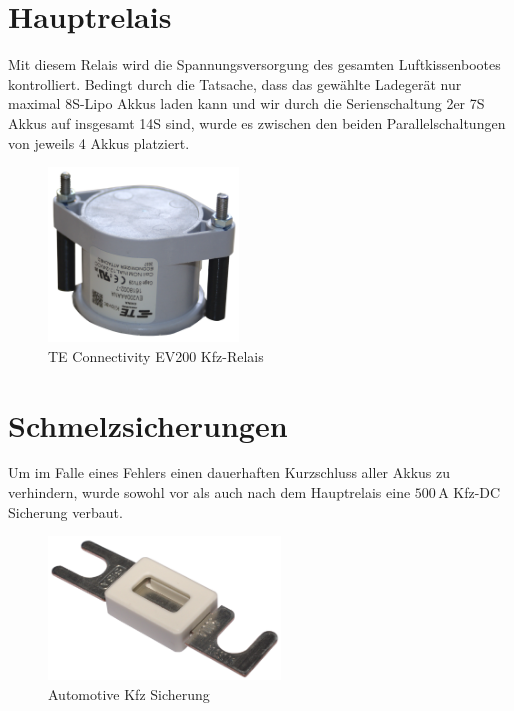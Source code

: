 \section{Hauptrelais\label{sec:hauptrelais}}
Mit diesem Relais wird die Spannungsversorgung des gesamten Luftkissenbootes kontrolliert. Bedingt durch die Tatsache, dass das gewählte Ladegerät nur maximal 8S-Lipo Akkus laden kann und wir durch die Serienschaltung 2er 7S Akkus auf insgesamt 14S sind, 
wurde es zwischen den beiden Parallelschaltungen von jeweils 4 Akkus platziert. 
\begin{figure}[h]
    \centering
    \includegraphics[width=0.45\textwidth]{Fotos/Hauptrelais.png}
    \caption{TE Connectivity EV200 Kfz-Relais}
\end{figure}

\section{Schmelzsicherungen\label{sec:schmelzsicherungen}}
Um im Falle eines Fehlers einen dauerhaften Kurzschluss aller Akkus zu verhindern, wurde sowohl vor als auch nach dem Hauptrelais eine $500\,\mathrm{A}$ Kfz-DC Sicherung verbaut.
\begin{figure}[h]
    \centering
    \includegraphics[width=0.55\textwidth]{Fotos/kfz_Sicherung.png}
    \caption{Automotive Kfz Sicherung}
\end{figure}
\newpage

